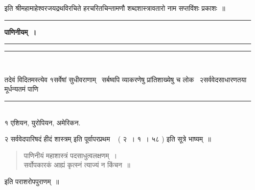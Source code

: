 \documentclass[11pt, openany]{book}
\begin{document}
\begin{center}
इति श्रीमहामाहेश्वरजयद्रथविरचिते हरचरितचिन्तामणौ शब्दशास्त्रावतारो नाम सप्तविंशः प्रकाशः~॥\\

\vspace{3cm}
\rule{0.1\linewidth}{0.5pt}
\end{center}

\newpage
\thispagestyle{empty}
\begin{center}
\textbf{\Large पाणिनीयम्~।}\\

\rule{0.15\linewidth}{0.5pt}
\end{center}

\noindent
\rule{1\linewidth}{0.5pt}\\

\begin{multicols}{2}
तदेवं विदितमस्त्येव १सर्वेषां सुधीवराणाम् \textendash\ सर्बष्वपि व्याकरणेषु प्रांतिशाख्येषु च लोक \textendash\ २सर्ववेदसाधारणतया मूर्धन्यतमं पाणि \textendash\ \\
\rule{1\linewidth}{0.5pt}\\

१ एशियन, युरोपियन, अमेरिकन.

२ {\qt सर्ववेदपारिषदं हीदं शास्त्रम्} इति {\qt पूर्वापरप्रथम \textendash\ } ( २~। १~। ५८ ) इति सूत्रे भाष्यम्~॥

\begin{quote}
{\qt पाणिनीयं महाशास्त्रं पदसाधुत्वलक्षणम्~।\\
सर्वोपकारकं आह्यं कृत्स्नं त्याज्यं न किंचन~॥}
\end{quote}

\noindent
इति पराशरोपपुराणम्~॥ 


\end{multicols}
\end{document}
